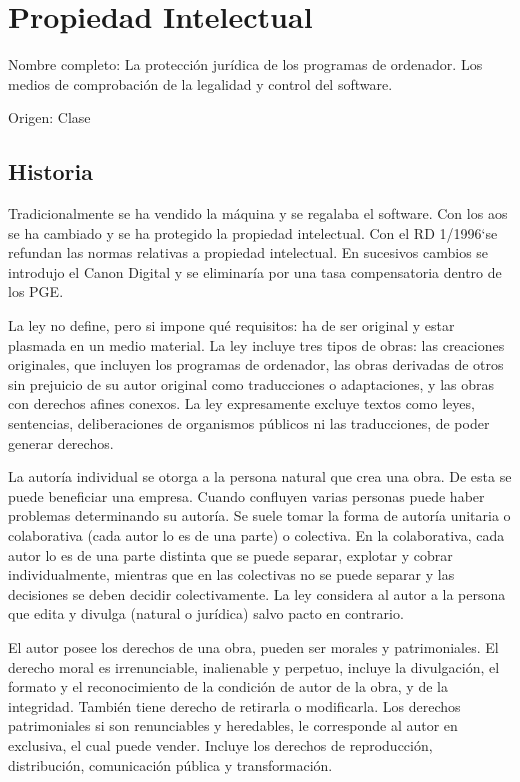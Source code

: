 \setcounter{section}{42}
\section{Propiedad Intelectual}

Nombre completo: La protección jurídica de los programas de ordenador. Los medios de comprobación de la legalidad y control del software.

Origen: Clase

\localtableofcontents

\subsection{Historia}
    Tradicionalmente se ha vendido la máquina y se regalaba el software. Con los aos se ha cambiado y se ha protegido la propiedad intelectual. Con el RD 1/1996`se refundan las normas relativas a propiedad intelectual. En sucesivos cambios se introdujo el Canon Digital y se eliminaría por una tasa compensatoria dentro de los PGE.

    La ley no define, pero si impone qué requisitos: ha de ser original y estar plasmada en un medio material. La ley incluye tres tipos de obras: las creaciones originales, que incluyen los programas de ordenador, las obras derivadas de otros sin prejuicio de su autor original como traducciones o adaptaciones, y las obras con derechos afines conexos. La ley expresamente excluye textos como leyes, sentencias, deliberaciones de organismos públicos ni las traducciones, de poder generar derechos.

    La autoría individual se otorga a la persona natural que crea una obra. De esta se puede beneficiar una empresa. Cuando confluyen varias personas puede haber problemas determinando su autoría. Se suele tomar la forma de autoría unitaria o colaborativa (cada autor lo es de una parte) o colectiva. En la colaborativa, cada autor lo es de una parte distinta que se puede separar, explotar y cobrar individualmente, mientras que en las colectivas no se puede separar y las decisiones se deben decidir colectivamente. La ley considera al autor a la persona que edita y divulga (natural o jurídica) salvo pacto en contrario.

    El autor posee los derechos de una obra, pueden ser morales y patrimoniales. El derecho moral es irrenunciable, inalienable y perpetuo, incluye la divulgación, el formato y el reconocimiento de la condición de autor de la obra, y de la integridad. También tiene derecho de retirarla o modificarla. Los derechos patrimoniales si son renunciables y heredables, le corresponde al autor en exclusiva, el cual puede vender. Incluye los derechos de reproducción, distribución, comunicación pública y transformación.

